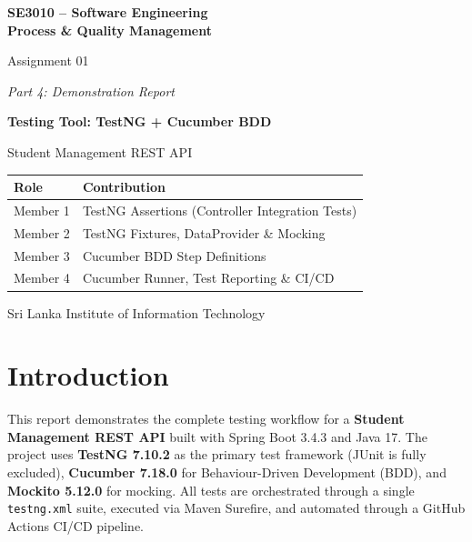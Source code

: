 \documentclass[12pt,a4paper]{article}
\begin{document}
\begin{titlepage}
    \centering
    \vspace*{2cm}
    {\Huge\bfseries\color{sliitblue} SE3010 -- Software Engineering\\Process \& Quality Management\par}
    \vspace{1cm}
    {\LARGE Assignment 01\par}
    \vspace{0.5cm}
    {\Large\itshape Part 4: Demonstration Report\par}
    \vspace{2cm}
    {\Large\bfseries Testing Tool: TestNG + Cucumber BDD\par}
    \vspace{0.3cm}
    {\large Student Management REST API\par}
    \vspace{2cm}
    \begin{tabular}{ll}
        \toprule
        \textbf{Role} & \textbf{Contribution} \\
        \midrule
        Member 1 & TestNG Assertions (Controller Integration Tests) \\
        Member 2 & TestNG Fixtures, DataProvider \& Mocking \\
        Member 3 & Cucumber BDD Step Definitions \\
        Member 4 & Cucumber Runner, Test Reporting \& CI/CD \\
        \bottomrule
    \end{tabular}
    \vspace{2cm}
    {\large Sri Lanka Institute of Information Technology\par}
    \vfill
\end{titlepage}

\tableofcontents
\newpage

\section{Introduction}

This report demonstrates the complete testing workflow for a \textbf{Student Management REST API} built with Spring Boot 3.4.3 and Java 17. The project uses \textbf{TestNG 7.10.2} as the primary test framework (JUnit is fully excluded), \textbf{Cucumber 7.18.0} for Behaviour-Driven Development (BDD), and \textbf{Mockito 5.12.0} for mocking. All tests are orchestrated through a single \texttt{testng.xml} suite, executed via Maven Surefire, and automated through a GitHub Actions CI/CD pipeline.
\end{document}
